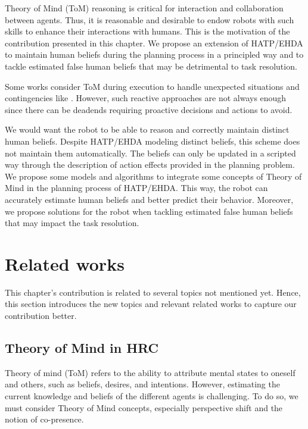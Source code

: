 Theory of Mind (ToM) reasoning is critical for interaction and collaboration between agents. Thus, it is reasonable and desirable to endow robots with such skills to enhance their interactions with humans. This is the motivation of the contribution presented in this chapter. We propose an extension of HATP/EHDA to maintain human beliefs during the planning process in a principled way and to tackle estimated false human beliefs that may be detrimental to task resolution.

Some works consider ToM during execution to handle unexpected situations and contingencies like \cite{devin_implemented_2016}. 
However, such reactive approaches are not always enough since there can be deadends requiring proactive decisions and actions to avoid. 

We would want the robot to be able to reason and correctly maintain distinct human beliefs. Despite HATP/EHDA modeling distinct beliefs, this scheme does not maintain them automatically. The beliefs can only be updated in a scripted way through the description of action effects provided in the planning problem. We propose some models and algorithms to integrate some concepts of Theory of Mind in the planning process of HATP/EHDA. This way, the robot can accurately estimate human beliefs and better predict their behavior. Moreover, we propose solutions for the robot when tackling estimated false human beliefs that may impact the task resolution.


\section{Related works}

    This chapter's contribution is related to several topics not mentioned yet. Hence, this section introduces the new topics and relevant related works to capture our contribution better.  

    \subsection{Theory of Mind in HRC}
    Theory of mind (ToM) refers to the ability to attribute mental states to oneself and others, such as beliefs, desires, and intentions. However, estimating the current knowledge and beliefs of the different agents is challenging. To do so, we must consider Theory of Mind concepts, especially perspective shift and the notion of co-presence.
    

